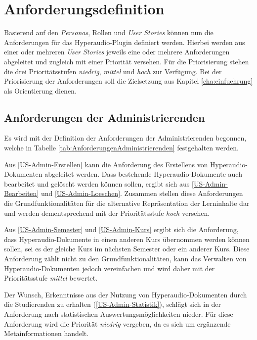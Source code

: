 \section{Anforderungsdefinition}
\label{sec:anforderungsdefinition}
Basierend auf den \textit{Personas}, Rollen und \textit{User Stories} können nun die Anforderungen für das Hyperaudio-Plugin definiert werden. Hierbei werden aus einer oder mehreren \textit{User Stories} jeweils eine oder mehrere Anforderungen abgeleitet und zugleich mit einer Priorität versehen. Für die Priorisierung stehen die drei Prioritätsstufen \textit{niedrig}, \textit{mittel} und \textit{hoch} zur Verfügung. Bei der Priorisierung der Anforderungen soll die Zielsetzung aus Kapitel \ref{cha:einfuehrung} als Orientierung dienen.

\subsection{Anforderungen der Administrierenden}
Es wird mit der Definition der Anforderungen der Administrierenden begonnen, welche in Tabelle \ref{tab:AnforderungenAdministrierenden} festgehalten werden. 

Aus \ref{US-Admin-Erstellen} kann die Anforderung des Erstellens von Hyperaudio-Dokumenten abgeleitet werden. Dass bestehende Hyperaudio-Dokumente auch bearbeitet und gelöscht werden können sollen, ergibt sich aus \ref{US-Admin-Bearbeiten} und \ref{US-Admin-Loeschen}. Zusammen stellen diese Anforderungen die Grundfunktionalitäten für die alternative Repräsentation der Lerninhalte dar und werden dementsprechend mit der Prioritätsstufe \textit{hoch} versehen.

Aus \ref{US-Admin-Semester} und \ref{US-Admin-Kurs} ergibt sich die Anforderung, dass Hyperaudio-Dokumente in einen anderen Kurs übernommen werden können sollen, sei es der gleiche Kurs im nächsten Semester oder ein anderer Kurs. Diese Anforderung zählt nicht zu den Grundfunktionalitäten, kann das Verwalten von Hyperaudio-Dokumenten jedoch vereinfachen und wird daher mit der Prioritätsstufe \textit{mittel} bewertet.

Der Wunsch, Erkenntnisse aus der Nutzung von Hyperaudio-Dokumenten durch die Studierenden zu erhalten (\ref{US-Admin-Statistik}), schlägt sich in der Anforderung nach statistischen Auswertungsmöglichkeiten nieder. Für diese Anforderung wird die Priorität \textit{niedrig} vergeben, da es sich um ergänzende Metainformationen handelt.

